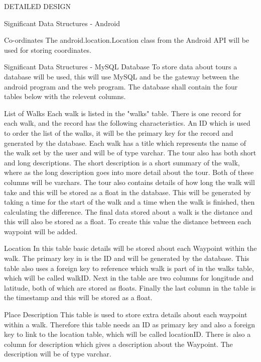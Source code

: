 \documentclass{article}
\begin{document}
\begin{section}{DETAILED DESIGN}
\begin{subsection}{Significant Data Structures - Android}
		\begin{subsubsection}{Co-ordinates}
			The android.location.Location class from the Android API will be used for storing coordinates.
		\end{subsubsection}
	\end{subsection}

	\begin{subsection}{Significant Data Structures - MySQL Database}
	To store data about tours a database will be used, this will use MySQL and be the gateway between the android program and the web program. The database shall contain the four tables below with the relevent columns.

		\begin{subsubsection}{List of Walks}
			Each walk is listed in the "walks" table. There is one record for each walk, and the record has 
		the following characteristics. An ID which is used to order the list of the walks, it will be the primary key for the record and generated by the database. Each walk has a title which represents the name of the walk set by the user and will be of type varchar. The tour also has both short and long descriptions. The short description is a short summary of the walk, where as the long description goes into more detail about the tour. Both of these columns will be varchars. The tour also contains details of how long the walk will take and this will be stored as a float in the database. This will be generated by taking a time for the start of the walk and a time when the walk is finished, then calculating the difference. The final data stored about a walk is the distance and this will also be stored as a float. To create this value the distance between each waypoint will be added.
		\end{subsubsection}
		
		\begin{subsubsection}{Location}
			In this table basic details will be stored about each Waypoint within the walk. The primary key in is the ID and will be generated by the database. This table also uses a foreign key to reference which walk is part of in the walks table, which will be called walkID. Next in the table are two columns for longitude and latitude, both of which are stored as floats. Finally the last column in the table is the timestamp and this will be stored as a float.
		\end{subsubsection}

		\begin{subsubsection}{Place Description}
			This table is used to store extra details about each waypoint within a walk. Therefore this table needs an ID as primary key and also a foreign key to link to the location table, which will be called locationID. There is also a column for description which gives a description about the Waypoint. The description will be of type varchar.
\end{subsubsection}
		

\end{subsection}
\end{section}
\end{document}
